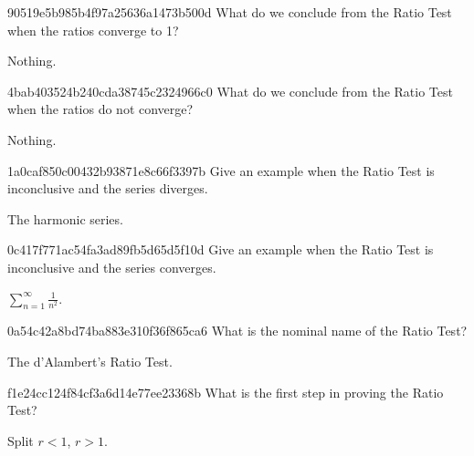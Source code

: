 \begin{note}{90519e5b985b4f97a25636a1473b500d}
    What do we conclude from the Ratio Test when the ratios converge to 1?

    \begin{cloze}{1}
        Nothing.
    \end{cloze}
\end{note}

\begin{note}{4bab403524b240cda38745c2324966c0}
    What do we conclude from the Ratio Test when the ratios do not converge?

    \begin{cloze}{1}
        Nothing.
    \end{cloze}
\end{note}

\begin{note}{1a0caf850c00432b93871e8c66f3397b}
    Give an example when the Ratio Test is inconclusive and the series diverges.

    \begin{cloze}{1}
        The harmonic series.
    \end{cloze}
\end{note}

\begin{note}{0c417f771ac54fa3ad89fb5d65d5f10d}
    Give an example when the Ratio Test is inconclusive and the series converges.

    \begin{cloze}{1}
        \({ \sum_{n=1}^{\infty} \frac{1}{n^2} }\).
    \end{cloze}
\end{note}

\begin{note}{0a54c42a8bd74ba883e310f36f865ca6}
    What is the nominal name of the Ratio Test?

    \begin{cloze}{1}
        The d'Alambert's Ratio Test.
    \end{cloze}
\end{note}

\begin{note}{f1e24cc124f84cf3a6d14e77ee23368b}
    What is the first step in proving the Ratio Test?

    \begin{cloze}{1}
        Split \({ r < 1 }\), \({ r > 1 }\).
    \end{cloze}
\end{note}

